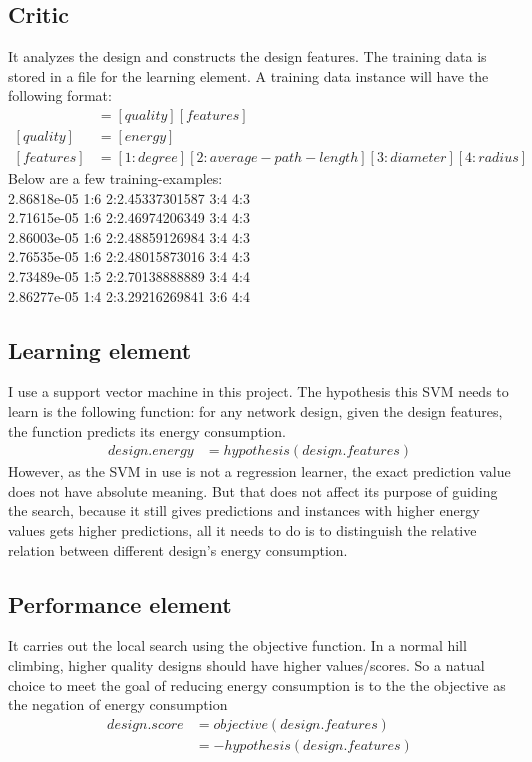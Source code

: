 \documentclass[12pt]{article}
\theoremstyle{definition}
\begin{document}
\subsection{Critic}
It analyzes the design and constructs the design features. The training data is stored in a file for the learning element. A training data instance will have the following format:
\begin{align*}
[training-example] &= [quality] [features]\\
[quality] &= [energy]\\
[features] &= [1:degree] [2:average-path-length] [3:diameter] [4:radius]
\end{align*}
Below are a few training-examples:\\
2.86818e-05 1:6 2:2.45337301587 3:4 4:3\\
2.71615e-05 1:6 2:2.46974206349 3:4 4:3\\
2.86003e-05 1:6 2:2.48859126984 3:4 4:3\\
2.76535e-05 1:6 2:2.48015873016 3:4 4:3\\
2.73489e-05 1:5 2:2.70138888889 3:4 4:4\\
2.86277e-05 1:4 2:3.29216269841 3:6 4:4\\
\subsection{Learning element}
I use a support vector machine \cite{joachims2006training} in this project. The hypothesis this SVM needs to learn is the following function: for any network design, given the design features, the function predicts its energy consumption.
\begin{align*}
  design.energy &= hypothesis(design.features)
\end{align*}
However, as the SVM in use is not a regression learner, the exact prediction value does not have absolute meaning. But that does not affect its purpose of guiding the search, because it still gives predictions and instances with higher energy values gets higher predictions, all it needs to do is to distinguish the relative relation between different design's energy consumption.
\subsection{Performance element}
It carries out the local search using the objective function. In a normal hill climbing, higher quality designs should have higher values/scores. So a natual choice to meet the goal of reducing energy consumption is to the the objective as the negation of energy consumption
\begin{align*}
  design.score
  &= objective(design.features)\\
  &= - hypothesis(design.features)
\end{align*}
\end{document}
